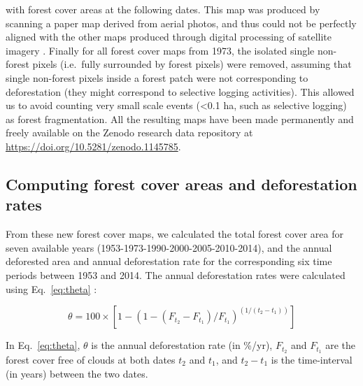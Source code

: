 \documentclass[a4paper, 12pt, leqno]{article}\usepackage[]{graphicx}\usepackage[]{color}
\begin{document}
with forest cover areas at the following dates. This map was produced
by scanning a paper map derived from aerial photos, and thus could not
be perfectly aligned with the other maps produced through digital
processing of satellite imagery \citep{Harper2007}. Finally for all
forest cover maps from 1973, the isolated single non-forest pixels
(i.e.~fully surrounded by forest pixels) were removed, assuming that
single non-forest pixels inside a forest patch were not corresponding
to deforestation (they might correspond to selective logging
activities). This allowed us to avoid counting very small scale events
(\textless 0.1 ha, such as selective logging) as forest
fragmentation. All the resulting maps have been made permanently and
freely available on the Zenodo research data repository at
\url{https://doi.org/10.5281/zenodo.1145785}.

\subsection{Computing forest cover areas and deforestation rates}

From these new forest cover maps, we calculated the total forest cover
area for seven available years (1953-1973-1990-2000-2005-2010-2014),
and the annual deforested area and annual deforestation rate for the
corresponding six time periods between 1953 and 2014. The annual
deforestation rates were calculated using Eq.~\ref{eq:theta}
\citep{Puyravaud2003, Vieilledent2013}:

\begin{equation}
  \label{eq:theta}
  \theta = 100 \times [1-(1-(F_{t_2}-F_{t_1})/F_{t_1})^{(1/(t_2-t_1))}]
\end{equation}

In Eq.~\ref{eq:theta}, $\theta$ is the annual deforestation rate (in \%/yr),
$F_{t_2}$ and $F_{t_1}$ are the forest cover free of clouds at both
dates $t_2$ and $t_1$, and $t_2-t_1$ is the time-interval (in
years) between the two dates.
\end{document}
